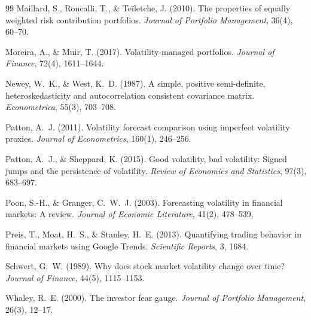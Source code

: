 \documentclass[12pt,a4paper]{article}
\begin{document}
\begin{thebibliography}{99}
Maillard, S., Roncalli, T., \& Te\"{i}letche, J. (2010). The properties of equally weighted risk contribution portfolios. \textit{Journal of Portfolio Management}, 36(4), 60--70.

Moreira, A., \& Muir, T. (2017). Volatility-managed portfolios. \textit{Journal of Finance}, 72(4), 1611--1644.

Newey, W.~K., \& West, K.~D. (1987). A simple, positive semi-definite, heteroskedasticity and autocorrelation consistent covariance matrix. \textit{Econometrica}, 55(3), 703--708.

Patton, A.~J. (2011). Volatility forecast comparison using imperfect volatility proxies. \textit{Journal of Econometrics}, 160(1), 246--256.

Patton, A.~J., \& Sheppard, K. (2015). Good volatility, bad volatility: Signed jumps and the persistence of volatility. \textit{Review of Economics and Statistics}, 97(3), 683--697.

Poon, S.-H., \& Granger, C.~W.~J. (2003). Forecasting volatility in financial markets: A review. \textit{Journal of Economic Literature}, 41(2), 478--539.

Preis, T., Moat, H.~S., \& Stanley, H.~E. (2013). Quantifying trading behavior in financial markets using Google Trends. \textit{Scientific Reports}, 3, 1684.

Schwert, G.~W. (1989). Why does stock market volatility change over time? \textit{Journal of Finance}, 44(5), 1115--1153.

Whaley, R.~E. (2000). The investor fear gauge. \textit{Journal of Portfolio Management}, 26(3), 12--17.

\end{thebibliography}
\end{document}
